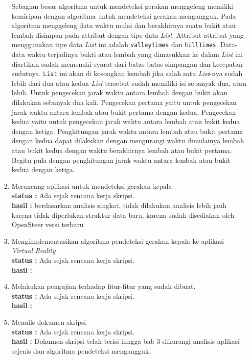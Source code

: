 \documentclass[a4paper,twoside]{article}
\begin{document}
\begin{enumerate}
Sebagian besar algoritma untuk mendeteksi gerakan menggeleng memiliki kemiripan dengan algoritma untuk mendeteksi gerakan mengangguk. Pada algoritma menggeleng data waktu mulai dan berakhirnya suatu bukit atau lembah disimpan pada attribut dengan tipe data \textit{List}. Attribut-attribut yang menggunakan tipe data \textit{List} ini adalah \texttt{valleyTimes} dan \texttt{hillTimes}. Data-data waktu terjadinya bukti atau lembah yang dimasukkan ke dalam \textit{List} ini diartikan sudah memenuhi syarat dari batas-batas simpangan dan kecepatan sudutnya. \texttt{List} ini akan di kosongkan kembali jika salah satu \textit{List}-nya sudah lebih dari dua atau kedua \textit{List} tersebut sudah memiliki isi sebanyak dua, atau lebih. 
Untuk pengecekan jarak waktu antara lembah dengan bukit akan dilakukan sebanyak dua kali. Pengecekan pertama yaitu untuk pengecekan jarak waktu antara lembah atau bukit pertama dengan kedua. Pengecekan kedua yaitu untuk pengecekan jarak waktu antara lembah atau bukit kedua dengan ketiga. Penghitungan jarak waktu antara lembah atau bukit pertama dengan kedua dapat dilakukan dengan mengurangi waktu dimulainya lembah atau bukit kedua dengan waktu berakhirnya lembah atau bukit pertama. Begitu pula dengan penghitungan jarak waktu antara lembah atau bukit kedua dengan ketiga.


		\item Merancang aplikasi untuk mendeteksi gerakan kepala\\
		{\bf status :} Ada sejak rencana kerja skripsi. \\
		{\bf hasil :} berdasarkan analisis singkat, tidak dilakukan analisis lebih jauh karena tidak diperlukan struktur data baru, karena sudah disediakan oleh OpenSteer versi terbaru

		\item Mengimplementasikan algoritma pendeteksi gerakan kepala ke aplikasi \textit{Virtual Reality}\\
		{\bf status :} Ada sejak rencana kerja skripsi.\\
		{\bf hasil :}

		\item Melakukan pengujian terhadap fitur-fitur yang sudah dibuat.\\
		{\bf status :} Ada sejak rencana kerja skripsi.\\
		{\bf hasil :}

		\item Menulis dokumen skripsi\\
		{\bf status :} Ada sejak rencana kerja skripsi.\\
		{\bf hasil :} 
		Dokumen skripsi telah terisi hingga bab 3 dikurangi analisis aplikasi sejenis dan algoritma pendeteksi mengangguk.
	\end{enumerate}
\end{document}
